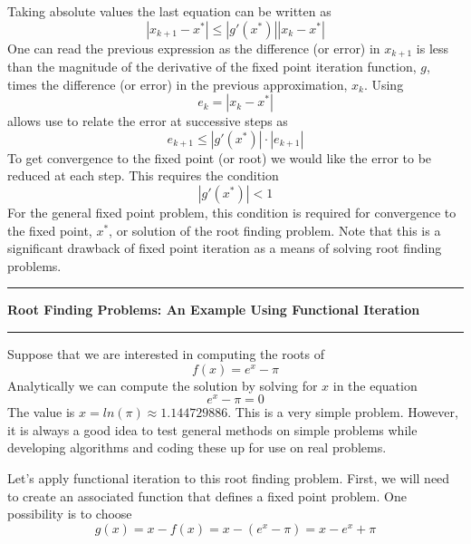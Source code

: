 \documentclass[10pt,fleqn]{article}
\begin{document}
Taking absolute values the last equation can be written as
$$
  | x_{k+1} - x^* | \leq | g'(x^*) | | x_k - x^* |
$$
One can read the previous expression as the difference (or error) in $x_{k+1}$
is less than the magnitude of the derivative of the fixed point iteration 
function, $g$, times the difference (or error) in the previous approximation,
$x_k$. Using
$$
  e_{k} = | x_k - x^* |
$$
allows use to relate the error at successive steps as
$$
  e_{k+1} \leq | g'(x^*) | \cdot | e_{k+1} |
$$
To get convergence to the fixed point (or root) we would like the error to be
reduced at each step. This requires the condition
$$
  | g'(x^*) | < 1
$$
For the general fixed point problem, this condition is required for convergence
to the fixed point, $x^*$, or solution of the root finding problem. Note that
this is a significant drawback of fixed point iteration as a means of solving
root finding problems.
\vskip0.1in\hrule\vskip0.1in
\noindent
{\bf Root Finding Problems: An Example Using Functional Iteration} 
\vskip0.1in\hrule\vskip0.1in
\noindent
Suppose that we are interested in computing the roots of
$$
  f(x) = e^x - \pi
$$
Analytically we can compute the solution by solving for $x$ in the equation
$$
  e^x - \pi = 0
$$
The value is $x=ln(\pi)\approx 1.144729886$. This is a very simple problem.
However, it is always a good idea to test general methods on simple problems
while developing algorithms and coding these up for use on real problems.

Let's apply functional iteration to this root finding problem. First, we will
need to create an associated function that defines a fixed point problem. One
possibility is to choose
$$
  g(x) = x - f(x) = x - ( e^x - \pi ) = x - e^x + \pi
$$

\end{document}
